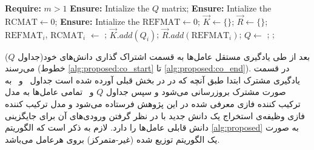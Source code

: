 \begin{algorithm}[t]
\caption{}\label{alg:proposed}
\begin{latin}
\begin{algorithmic}[1]
\State \textbf{Require:} $m > 1$ 
\State \textbf{Ensure:} {Intialize the $Q$ matrix};
\State \textbf{Ensure:} {Intialize the $\text{RCMAT} \gets 0$};
\State \textbf{Ensure:} {Intialize the $\text{REFMAT} \gets 0$};
		 \label{alg:proposed:q_start}
		\label{alg:proposed:il_start}
		 \label{alg:proposed:q_end}
		 \label{alg:proposed:update_refmat}
		\label{alg:proposed:il_end}
		\State $\vec{K} \gets \{\}$; \label{alg:proposed:co_start}
		\State $\vec{R} \gets \{\}$;
			\State $\text{REFMAT}_i$, $\text{RCMAT}_i$ $\gets$ ;
			\State $\vec{K}.add(Q_i)$;
			\State $\vec{R}.add(\text{REFMAT}_i)$;
		\EndFor
		\State $Q \gets$ ; \label{alg:proposed:FCI_Combiner}
		\label{alg:proposed:QCO_replacement}
		;
		\label{alg:proposed:co_end}
	\EndIf
\EndWhile
\EndProcedure
\end{algorithmic}
\end{latin}
\end{algorithm}

بعد از طی یادگیری مستقل عامل‌ها به قسمت اشتراک گذاری دانش‌های خود(جداول $Q$) می‌رسند (خطوط
\ref{alg:proposed:co_start} تا \ref{alg:proposed:co_end}).
در قسمت یادگیری مشترک ابتدا طبق آنچه که در در بخش قبلی آورده شده است جداول \ و \ به صورت مشترک بروزرسانی می‌شود و سپس جداول $Q$ و \ تمامی عامل‌ها به مدل ترکیب کننده فازی معرفی شده در این پژوهش فرستاده می‌شود و مدل ترکیب کننده فازی وظیفه‌ی استخراج یک دانش جدید با در نظر گرفتن ورودی‌های آن برای جایگزینی دانش قابلی عامل‌ها را دارد. لازم به ذکر است که الگوریتم \ref{alg:proposed} به صورت یک الگوریتم توزیع شده (غیر-متمرکز) بروی هرعامل می‌باشد.

